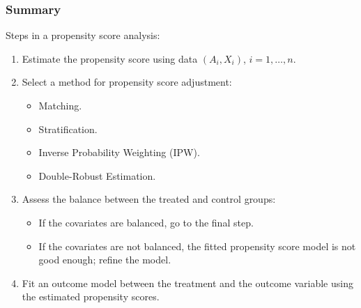 \documentclass[oneside]{book}\usepackage[]{graphicx}\usepackage[svgnames]{xcolor}
\begin{document}
\subsubsection{Summary}
Steps in a propensity score analysis:
\begin{enumerate}[1.]
      \item Estimate the propensity score using data $ (A_i,X_i) $, $ i=1,\ldots,n $.
      \item Select a method for propensity score adjustment:
            \begin{itemize}
                  \item Matching.
                  \item Stratification.
                  \item Inverse Probability Weighting (IPW).
                  \item Double-Robust Estimation.
            \end{itemize}
      \item Assess the balance between the treated and control groups:
            \begin{itemize}
                  \item If the covariates are balanced, go to the final step.
                  \item If the covariates are not balanced, the fitted propensity score
                        model is not good enough; refine the model.
            \end{itemize}
      \item Fit an outcome model between the treatment and the
            outcome variable using the estimated propensity scores.
\end{enumerate}
\end{document}
